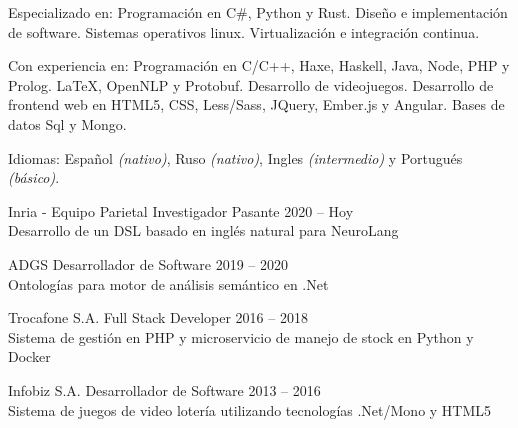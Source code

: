 \documentclass[10pt,a4paper]{article}
\begin{document}
\spacedhrule{0.8em}{-0.4em} %






\inlineheadsection
  { Especializado en: }
  { Programación en C\#, Python y Rust. Diseño e implementación de software. Sistemas operativos linux. Virtualización e integración continua. }

\inlineheadsection
  { Con experiencia en: }
  { Programación en C/C++, Haxe, Haskell, Java, Node, PHP y Prolog. \LaTeX, OpenNLP y Protobuf. Desarrollo de videojuegos. Desarrollo de frontend web en HTML5, CSS, Less/Sass, JQuery, Ember.js y Angular. Bases de datos Sql y Mongo. }

  \vspace{0.5em}
\inlineheadsection
  { Idiomas: }
  { Español \emph{(nativo)}, Ruso \emph{(nativo)}, Ingles \emph{(intermedio)} y Portugués \emph{(básico)}. }


\spacedhrule{1.9em}{-0.4em} %






\vspace{0.2em}
\headedsection
    { Inria - Equipo Parietal }
    { \textsc{} }{
    \headedsubsection
        { Investigador Pasante }
        { 2020 -- Hoy }
        { \\ Desarrollo de un DSL basado en inglés natural para NeuroLang \href{https://neurolang.github.io/}{\ExternalLink}  }
}

\vspace{0.2em}
\headedsection
    { ADGS }
    { \textsc{} }{
    \headedsubsection
        { Desarrollador de Software }
        { 2019 -- 2020 }
        { \\ Ontologías para motor de análisis semántico en .Net \href{http://www.tasmo.ai/}{\ExternalLink} }
}

\vspace{0.2em}
\headedsection
    { Trocafone S.A. }
    { \textsc{} }{
    \headedsubsection
        { Full Stack Developer }
        { 2016 -- 2018 }
        { \\ Sistema de gestión en PHP y microservicio de manejo de stock en Python y Docker }
}

\vspace{0.2em}
\headedsection
    { Infobiz S.A. }
    { \textsc{} }{
    \headedsubsection
        { Desarrollador de Software }
        { 2013 -- 2016 }
        { \\ Sistema de juegos de video lotería utilizando tecnologías .Net/Mono y HTML5 \href{http://www.infobiz.com.ar/english/ticket_games.php}{\ExternalLink} }
}
\end{document}
